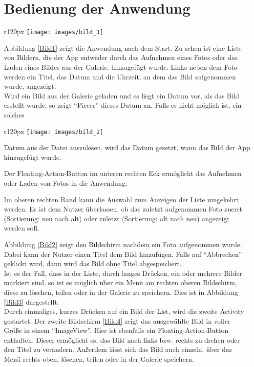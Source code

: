 
\chapter{Bedienung der Anwendung}
\begin{wrapfigure}{r}{120px}
\label{Bild1}
\centering
\texttt{[image: images/bild\_1]}
\caption{Übersicht}
\end{wrapfigure}
Abbildung \ref{Bild1} zeigt die Anwendung nach dem Start. Zu sehen ist eine Liste von Bildern, die der App entweder durch das Aufnehmen eines Fotos oder das Laden eines Bildes
aus der Galerie, hinzugefügt wurde. Links neben dem Foto werden ein Titel, das Datum und die Uhrzeit, an dem das Bild aufgenommen wurde, angezeigt. \\
Wird ein Bild aus der Galerie geladen und es liegt ein Datum vor, als das Bild erstellt wurde, so zeigt \enquote{Piccer} dieses Datum an. Falls es nicht möglich ist, ein solches
\begin{wrapfigure}{r}{120px}
\label{Bild2}
\centering
\texttt{[image: images/bild\_2]}
\caption{Titel vergeben}
\end{wrapfigure}
Datum aus der Datei auszulesen, wird das Datum gesetzt, wann das Bild der App hinzugefügt wurde.

Der Floating-Action-Button im unteren rechten Eck ermöglicht das Aufnehmen oder Laden von Fotos in die Anwendung.

Im oberen rechten Rand kann die Auswahl zum Anzeigen der Liste umgekehrt werden. Es ist dem Nutzer überlassen, ob das zuletzt aufgenommen Foto zuerst (Sortierung: neu nach alt) oder zuletzt (Sortierung: alt nach neu) angezeigt werden soll.


Abbildung \ref{Bild2} zeigt den Bildschirm nachdem ein Foto aufgenommen wurde.
Dabei kann der Nutzer einen Titel dem Bild hinzufügen. Falls auf \enquote{Abbrechen}
 geklickt wird, dann wird das Bild ohne Titel abgespeichert.\\

Ist es der Fall, dass in der Liste, durch langes Drücken, ein oder mehrere Bilder markiert sind, so ist es möglich über ein Menü am rechten oberen Bildschirm, diese zu löschen, teilen oder in der Galerie zu speichern. Dies ist in Abbildung \ref{Bild3} dargestellt.\\

Durch einmaliges, kurzes Drücken auf ein Bild der List, wird die zweite Activity
gestartet. Der zweite Bildschirm \ref{Bild4} zeigt das ausgewählte Bild in voller Größe in einem \enquote{ImageView}. Hier ist ebenfalls ein Floating-Action-Button enthalten. Dieser ermöglicht es, das Bild nach links bzw. rechts zu drehen oder den Titel zu verändern.
Außerdem lässt sich das Bild auch einzeln, über das Menü rechts oben, löschen, teilen oder in der Galerie speichern.

